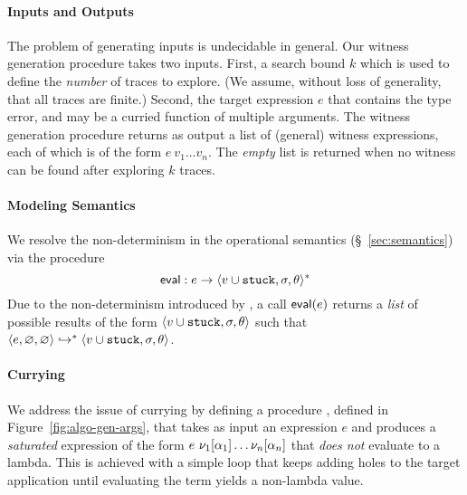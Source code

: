 \paragraph{Inputs and Outputs}
%
The problem of generating inputs is undecidable in general.
%
Our witness generation procedure takes two inputs.
%
First, a search bound $k$ which is used to define the \emph{number} of
traces to explore. (We assume, without loss of generality, that all
traces are finite.)
%
Second, the target expression $e$ that contains the type error,
and may be a curried function of multiple arguments.
%
The witness generation procedure returns as output a list of (general)
witness expressions, each of which is of the form $e\ v_1 \ldots v_n$.
%
The \emph{empty} list is returned when no witness can be found after
exploring $k$ traces.


\paragraph{Modeling Semantics}
%
We resolve the non-determinism in the operational semantics
(\S~\ref{sec:semantics}) via the procedure
%
$$
\mathsf{eval} : e \rightarrow \langle v \cup \mathtt{stuck}, \sigma, \theta \rangle^{*}
$$
%
Due to the non-determinism introduced by \gensym, a call
$\mathsf{eval}(e)$ returns a \emph{list}
of possible results of the form $\langle v \cup \mathtt{stuck}, \sigma, \theta \rangle$
such that $\langle e, \varnothing, \varnothing \rangle \hookrightarrow^{*} \langle v \cup \mathtt{stuck}, \sigma, \theta \rangle{}$.

\paragraph{Currying}
We address the issue of currying by defining a procedure ,
defined in Figure~\ref{fig:algo-gen-args}, that takes as input an
expression $e$ and produces a \emph{saturated} expression of the form
$e\ \nu_1[\alpha_1] \ldots \nu_n[\alpha_n]$ that
\emph{does not} evaluate to a lambda.
%
This is achieved with a simple loop that keeps adding holes to the
target application until evaluating the term yields a non-lambda value.
%
%

